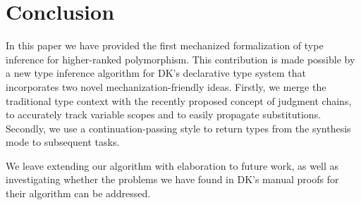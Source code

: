 \section{Conclusion}

In this paper we have provided the first mechanized formalization of type
inference for higher-ranked polymorphism. This contribution is made possible by
a new type inference algorithm for DK's declarative type system that
incorporates two novel mechanization-friendly ideas. Firstly, we merge the
traditional type context with the recently proposed concept of judgment chains,
to accurately track variable scopes and to easily propagate substitutions.
Secondly, we use a continuation-passing style to return types from the
synthesis mode to subsequent tasks.

We leave extending our algorithm with elaboration to future work, as well as
investigating whether the problems we have found in DK's manual proofs for
their algorithm can be addressed.

